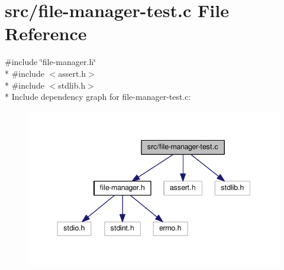 \hypertarget{file-manager-test_8c}{\section{src/file-\/manager-\/test.c File Reference}
\label{file-manager-test_8c}
}
{\ttfamily \#include \char`\"{}file-\/manager.\-h\char`\"{}}\\*
{\ttfamily \#include $<$assert.\-h$>$}\\*
{\ttfamily \#include $<$stdlib.\-h$>$}\\*
Include dependency graph for file-\/manager-\/test.c\-:
\nopagebreak
\begin{figure}[H]
\begin{center}
\leavevmode
\includegraphics[width=344pt]{file-manager-test_8c__incl}
\end{center}
\end{figure}
